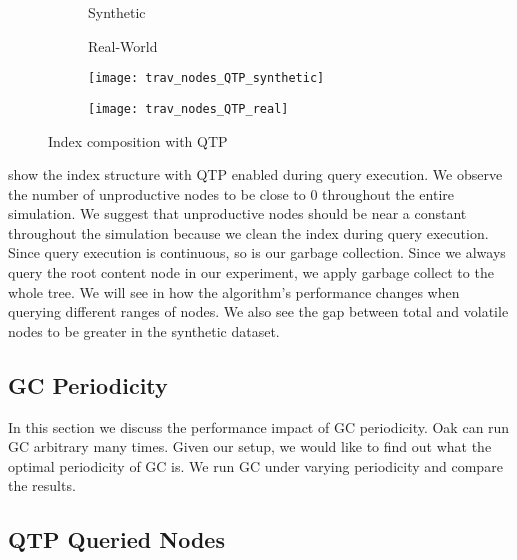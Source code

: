 \documentclass[abstracton,12pt]{scrartcl}
\theoremstyle{definition}
\begin{document}
\begin{figure}[H]
  \centering
  \begin{subfigure}{0.49\linewidth}
    \centering Synthetic
  \end{subfigure}
  \begin{subfigure}{0.49\linewidth}
    \centering Real-World
  \end{subfigure}
  \begin{subfigure}{0.49\linewidth}
    \texttt{[image: trav\_nodes\_QTP\_synthetic]}
    \caption{}
    \label{fig:trav_nodes_QTP_synthetic}
  \end{subfigure}
  \begin{subfigure}{0.49\linewidth}
    \texttt{[image: trav\_nodes\_QTP\_real]}
    \caption{}
    \label{fig:trav_nodes_QTP_real}
  \end{subfigure}
  \caption{Index composition with QTP}
\end{figure}

 show the index
structure with QTP enabled during query execution. We observe the number of
unproductive nodes to be close to 0 throughout the entire simulation. We suggest
that unproductive nodes should be near a constant throughout the simulation
because we clean the index during query execution. Since query execution is
continuous, so is our garbage collection. Since we always query the root content
node in our experiment, we apply garbage collect to the whole tree. We will see
in  how the algorithm's performance changes when
querying different ranges of nodes. We also see the gap between total and
volatile nodes to be greater in the synthetic dataset.

\subsection{GC Periodicity}

\label{sec:periodicity}

In this section we discuss the performance impact of GC periodicity. Oak can run
GC arbitrary many times. Given our setup, we would like to find out what the
optimal periodicity of GC is. We run GC under varying periodicity and compare
the results. 

\subsection{QTP Queried Nodes}
\end{document}
